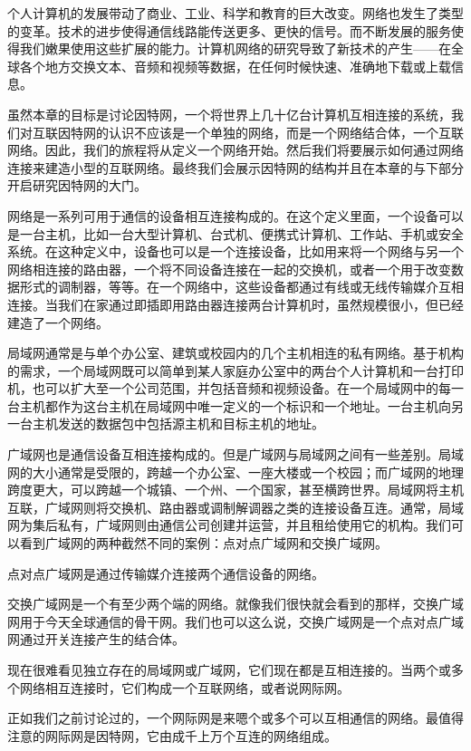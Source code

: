 个人计算机的发展带动了商业、工业、科学和教育的巨大改变。网络也发生了类型的变革。技术的进步使得通信线路能传送更多、更快的信号。而不断发展的服务使得我们嫩果使用这些扩展的能力。计算机网络的研究导致了新技术的产生——在全球各个地方交换文本、音频和视频等数据，在任何时候快速、准确地下载或上载信息。

虽然本章的目标是讨论因特网，一个将世界上几十亿台计算机互相连接的系统，我们对互联因特网的认识不应该是一个单独的网络，而是一个网络结合体，一个互联网络。因此，我们的旅程将从定义一个网络开始。然后我们将要展示如何通过网络连接来建造小型的互联网络。最终我们会展示因特网的结构并且在本章的与下部分开启研究因特网的大门。

网络是一系列可用于通信的设备相互连接构成的。在这个定义里面，一个设备可以是一台主机，比如一台大型计算机、台式机、便携式计算机、工作站、手机或安全系统。在这种定义中，设备也可以是一个连接设备，比如用来将一个网络与另一个网络相连接的路由器，一个将不同设备连接在一起的交换机，或者一个用于改变数据形式的调制器，等等。在一个网络中，这些设备都通过有线或无线传输媒介互相连接。当我们在家通过即插即用路由器连接两台计算机时，虽然规模很小，但已经建造了一个网络。

局域网通常是与单个办公室、建筑或校园内的几个主机相连的私有网络。基于机构的需求，一个局域网既可以简单到某人家庭办公室中的两台个人计算机和一台打印机，也可以扩大至一个公司范围，并包括音频和视频设备。在一个局域网中的每一台主机都作为这台主机在局域网中唯一定义的一个标识和一个地址。一台主机向另一台主机发送的数据包中包括源主机和目标主机的地址。

广域网也是通信设备互相连接构成的。但是广域网与局域网之间有一些差别。局域网的大小通常是受限的，跨越一个办公室、一座大楼或一个校园；而广域网的地理跨度更大，可以跨越一个城镇、一个州、一个国家，甚至横跨世界。局域网将主机互联，广域网则将交换机、路由器或调制解调器之类的连接设备互连。通常，局域网为集后私有，广域网则由通信公司创建并运营，并且租给使用它的机构。我们可以看到广域网的两种截然不同的案例：点对点广域网和交换广域网。

点对点广域网是通过传输媒介连接两个通信设备的网络。

交换广域网是一个有至少两个端的网络。就像我们很快就会看到的那样，交换广域网用于今天全球通信的骨干网。我们也可以这么说，交换广域网是一个点对点广域网通过开关连接产生的结合体。

现在很难看见独立存在的局域网或广域网，它们现在都是互相连接的。当两个或多个网络相互连接时，它们构成一个互联网络，或者说网际网。

正如我们之前讨论过的，一个网际网是来嗯个或多个可以互相通信的网络。最值得注意的网际网是因特网，它由成千上万个互连的网络组成。

